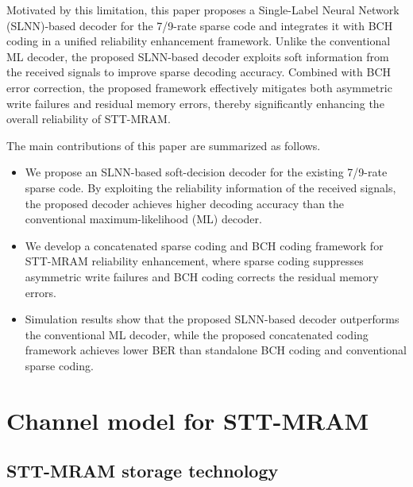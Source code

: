 \documentclass[conference]{IEEEtran}
\begin{document}
Motivated by this limitation, this paper proposes a Single-Label Neural Network (SLNN)-based decoder for the 7/9-rate sparse code and integrates it with BCH coding in a unified reliability enhancement framework. Unlike the conventional ML decoder, the proposed SLNN-based decoder exploits soft information from the received signals to improve sparse decoding accuracy. Combined with BCH error correction, the proposed framework effectively mitigates both asymmetric write failures and residual memory errors, thereby significantly enhancing the overall reliability of STT-MRAM.

The main contributions of this paper are summarized as follows.
%
\begin{itemize}
    \item We propose an SLNN-based soft-decision decoder for the existing 7/9-rate sparse code. By exploiting the reliability information of the received signals, the proposed decoder achieves higher decoding accuracy than the conventional maximum-likelihood (ML) decoder.

    \item We develop a concatenated sparse coding and BCH coding framework for STT-MRAM reliability enhancement, where sparse coding suppresses asymmetric write failures and BCH coding corrects the residual memory errors.

    \item Simulation results show that the proposed SLNN-based decoder outperforms the conventional ML decoder, while the proposed concatenated coding framework achieves lower BER than standalone BCH coding and conventional sparse coding.
\end{itemize}



\section{Channel model for STT-MRAM}
\subsection{STT-MRAM storage technology}
\end{document}
